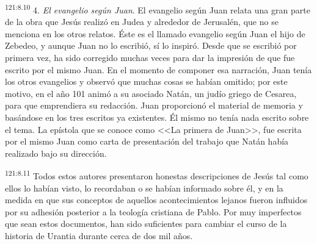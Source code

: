 \par 
\textsuperscript{121:8.10} 4. \textit{El evangelio según Juan}. El evangelio según Juan relata una gran parte de la obra que Jesús realizó en Judea y alrededor de Jerusalén, que no se menciona en los otros relatos. Éste es el llamado evangelio según Juan el hijo de Zebedeo, y aunque Juan no lo escribió, sí lo inspiró. Desde que se escribió por primera vez, ha sido corregido muchas veces para dar la impresión de que fue escrito por el mismo Juan. En el momento de componer esa narración, Juan tenía los otros evangelios y observó que muchas cosas se habían omitido; por este motivo, en el año 101 animó a su asociado Natán, un judío griego de Cesarea, para que emprendiera su redacción. Juan proporcionó el material de memoria y basándose en los tres escritos ya existentes. Él mismo no tenía nada escrito sobre el tema. La epístola que se conoce como <<La primera de Juan>>, fue escrita por el mismo Juan como carta de presentación del trabajo que Natán había realizado bajo su dirección.

\par 
\textsuperscript{121:8.11} Todos estos autores presentaron honestas descripciones de Jesús tal como ellos lo habían visto, lo recordaban o se habían informado sobre él, y en la medida en que sus conceptos de aquellos acontecimientos lejanos fueron influidos por su adhesión posterior a la teología cristiana de Pablo. Por muy imperfectos que sean estos documentos, han sido suficientes para cambiar el curso de la historia de Urantia durante cerca de dos mil años.

